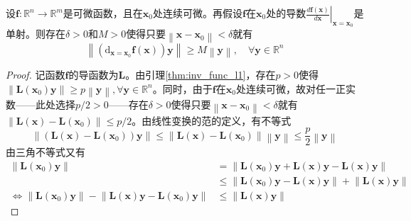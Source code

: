 \documentclass[main.tex]{subfiles}
\begin{document}
\begin{lemma}\label{thm:inv_func_l2}
    设$\mathbf{f}:\mathbb{R}^n\rightarrow\mathbb{R}^m$是可微函数，且在$\mathbf{x}_0$处连续可微。再假设$\mathbf{f}$在$\mathbf{x}_0$处的导数$\left.\frac{d\mathbf{f}\left(\mathbf{x}\right)}{d\mathbf{x}}\right|_{\mathbf{x}=\mathbf{x}_0}$是单射。则存在$\delta>0$和$M>0$使得只要$\left\|\mathbf{x}-\mathbf{x}_0\right\|<\delta$就有
    \[
        \left\|\left(\mathrm{d}_{\mathbf{x}=\mathbf{x}_0}\mathbf{f}\left(\mathbf{x}\right)\right)\mathbf{y}\right\|\geq M\left\|\mathbf{y}\right\|,\quad\forall\mathbf{y}\in\mathbb{R}^n
    \]
\end{lemma}
\begin{proof}
    记函数$\mathbf{f}$的导函数为$\mathbf{L}$。由引理\ref{thm:inv_func_l1}，存在$p>0$使得$\left\|\mathbf{L}\left(\mathbf{x}_0\right)\mathbf{y}\right\|\geq p\left\|\mathbf{y}\right\|,\forall\mathbf{y}\in\mathbb{R}^n$。同时，由于$\mathbf{f}$在$\mathbf{x}_0$处连续可微，故对任一正实数——此处选择$p/2>0$——存在$\delta>0$使得只要$\left\|\mathbf{x}-\mathbf{x}_0\right\|<\delta$就有$\left\|\mathbf{L}\left(\mathbf{x}\right)-\mathbf{L}\left(\mathbf{x}_0\right)\right\|\leq p/2$。由线性变换的范的定义，有不等式
    \[
        \left\|\left(\mathbf{L}\left(\mathbf{x}\right)-\mathbf{L}\left(\mathbf{x}_0\right)\right)\mathbf{y}\right\|\leq\left\|\mathbf{L}\left(\mathbf{x}\right)-\mathbf{L}\left(\mathbf{x}_0\right)\right\|\left\|\mathbf{y}\right\|\leq\frac{p}{2}\left\|\mathbf{y}\right\|\]
    由三角不等式又有
    \begin{align*}
        \left\|\mathbf{L}\left(\mathbf{x}_0\right)\mathbf{y}\right\|                                                                                                                         & =\left\|\mathbf{L}\left(\mathbf{x}_0\right)\mathbf{y}+\mathbf{L}\left(\mathbf{x}\right)\mathbf{y}-\mathbf{L}\left(\mathbf{x}\right)\mathbf{y}\right\|                   \\
                                                                                                                                                                                             & \leq\left\|\mathbf{L}\left(\mathbf{x}_0\right)\mathbf{y}-\mathbf{L}\left(\mathbf{x}\right)\mathbf{y}\right\|+\left\|\mathbf{L}\left(\mathbf{x}\right)\mathbf{y}\right\| \\
        \Leftrightarrow\left\|\mathbf{L}\left(\mathbf{x}_0\right)\mathbf{y}\right\|-\left\|\mathbf{L}\left(\mathbf{x}\right)\mathbf{y}-\mathbf{L}\left(\mathbf{x}_0\right)\mathbf{y}\right\| & \leq\left\|\mathbf{L}\left(\mathbf{x}\right)\mathbf{y}\right\|

\end{align*}
\end{proof}
\end{document}
